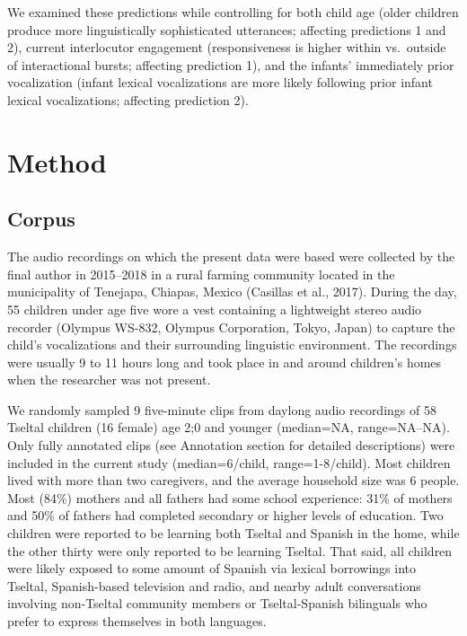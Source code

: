 \documentclass[
  man]{apa6}
\begin{document}
We examined these predictions while controlling for both child age (older children produce more linguistically sophisticated utterances; affecting predictions 1 and 2), current interlocutor engagement (responsiveness is higher within vs.~outside of interactional bursts; affecting prediction 1), and the infants' immediately prior vocalization (infant lexical vocalizations are more likely following prior infant lexical vocalizations; affecting prediction 2).

\hypertarget{method}{%
\section{Method}\label{method}}

\hypertarget{corpus}{%
\subsection{Corpus}\label{corpus}}

The audio recordings on which the present data were based were collected by the final author in 2015--2018 in a rural farming community located in the municipality of Tenejapa, Chiapas, Mexico (Casillas et al., 2017). During the day, 55 children under age five wore a vest containing a lightweight stereo audio recorder (Olympus WS-832, Olympus Corporation, Tokyo, Japan) to capture the child's vocalizations and their surrounding linguistic environment. The recordings were usually 9 to 11 hours long and took place in and around children's homes when the researcher was not present.

We randomly sampled 9 five-minute clips from daylong audio recordings of 58 Tseltal children (16 female) age 2;0 and younger (median=NA, range=NA--NA). Only fully annotated clips (see Annotation section for detailed descriptions) were included in the current study (median=6/child, range=1-8/child). Most children lived with more than two caregivers, and the average household size was 6 people. Most (84\%) mothers and all fathers had some school experience: 31\% of mothers and 50\% of fathers had completed secondary or higher levels of education. Two children were reported to be learning both Tseltal and Spanish in the home, while the other thirty were only reported to be learning Tseltal. That said, all children were likely exposed to some amount of Spanish via lexical borrowings into Tseltal, Spanish-based television and radio, and nearby adult conversations involving non-Tseltal community members or Tseltal-Spanish bilinguals who prefer to express themselves in both languages.
\end{document}
